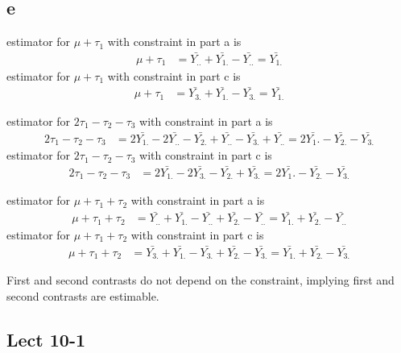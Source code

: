 \documentclass[11pt,letterpaper]{article}
\begin{document}
\subsection*{e}
\noindent estimator for $\mu + \tau_1$ with constraint in part a is 
\begin{align*}
\mu + \tau_1 &= \bar{Y_{..}} + \bar{Y_{1.}} - \bar{Y_{..}} = \bar{Y_{1.}} 
\end{align*}
\noindent estimator for $\mu + \tau_1$ with constraint in part c is 
\begin{align*}
\mu + \tau_1 &= \bar{Y_{3.}} + \bar{Y_{1.}} - \bar{Y_{3.}} = \bar{Y_{1.}} 
\end{align*}

\noindent estimator for $2 \tau_1 - \tau_2 - \tau_3$ with constraint in part a is 
\begin{align*}
2 \tau_1 - \tau_2 - \tau_3 &= 2 \bar{Y_{1.}} - 2\bar{Y_{..}} - \bar{Y_{2.}} + \bar{Y_{..}} - \bar{Y_{3.}} + \bar{Y_{..}} = 2 \bar{Y_1.} - \bar{Y_{2.}} - \bar{Y_{3.}}
\end{align*}
\noindent estimator for $2 \tau_1 - \tau_2 - \tau_3$ with constraint in part c is 
\begin{align*}
2 \tau_1 - \tau_2 - \tau_3 &= 2 \bar{Y_{1.}} - 2\bar{Y_{3.}} - \bar{Y_{2.}} + \bar{Y_{3.}} = 2 \bar{Y_1.} - \bar{Y_{2.}} - \bar{Y_{3.}}
\end{align*}

\noindent estimator for $\mu + \tau_1 + \tau_2$ with constraint in part a is 
\begin{align*}
\mu + \tau_1 + \tau_2 &= \bar{Y_{..}} + \bar{Y_{1.}} - \bar{Y_{..}} + \bar{Y_{2.}} - \bar{Y_{..}} = \bar{Y_{1.}} + \bar{Y_{2.}} - \bar{Y_{..}}
\end{align*}
\noindent estimator for $\mu + \tau_1 + \tau_2$ with constraint in part c is 
\begin{align*}
\mu + \tau_1 + \tau_2 &= \bar{Y_{3.}} + \bar{Y_{1.}} - \bar{Y_{3.}} + \bar{Y_{2.}} - \bar{Y_{3.}} = \bar{Y_{1.}} + \bar{Y_{2.}} - \bar{Y_{3.}}
\end{align*}

\noindent First and second contrasts do not depend on the constraint, implying first and second contrasts are estimable. 

\subsection*{Lect 10-1}
\end{document}
